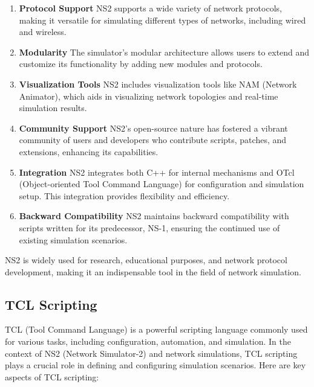 \documentclass[11pt]{article}
\begin{document}
\begin{enumerate}
    \item \textbf{Protocol Support} NS2 supports a wide variety of network protocols, making it versatile for simulating different types of networks, including wired and wireless.

    \item \textbf{Modularity} The simulator's modular architecture allows users to extend and customize its functionality by adding new modules and protocols.

    \item \textbf{Visualization Tools} NS2 includes visualization tools like NAM (Network Animator), which aids in visualizing network topologies and real-time simulation results.

    \item \textbf{Community Support} NS2's open-source nature has fostered a vibrant community of users and developers who contribute scripts, patches, and extensions, enhancing its capabilities.

    \item \textbf{Integration} NS2 integrates both C++ for internal mechanisms and OTcl (Object-oriented Tool Command Language) for configuration and simulation setup. This integration provides flexibility and efficiency.

    \item \textbf{Backward Compatibility} NS2 maintains backward compatibility with scripts written for its predecessor, NS-1, ensuring the continued use of existing simulation scenarios.
\end{enumerate}

NS2 is widely used for research, educational purposes, and network protocol development, making it an indispensable tool in the field of network simulation.


\subsection{TCL Scripting}

TCL (Tool Command Language) is a powerful scripting language commonly used for various tasks, including configuration, automation, and simulation. In the context of NS2 (Network Simulator-2) and network simulations, TCL scripting plays a crucial role in defining and configuring simulation scenarios. Here are key aspects of TCL scripting:
\end{document}
